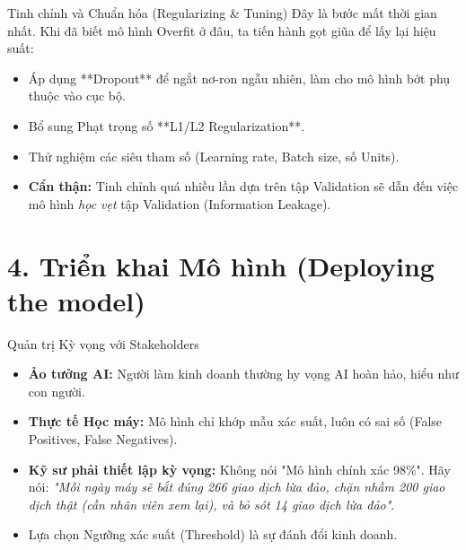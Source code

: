 \documentclass[aspectratio=169]{beamer}
\begin{document}
\begin{frame}{Tinh chỉnh và Chuẩn hóa (Regularizing \& Tuning)}
    Đây là bước mất thời gian nhất. Khi đã biết mô hình Overfit ở đâu, ta tiến hành gọt giũa để lấy lại hiệu suất:
    \begin{itemize}
        \item Áp dụng **Dropout** để ngắt nơ-ron ngẫu nhiên, làm cho mô hình bớt phụ thuộc vào cục bộ.
        \item Bổ sung Phạt trọng số **L1/L2 Regularization**.
        \item Thử nghiệm các siêu tham số (Learning rate, Batch size, số Units).
        \item \textbf{Cẩn thận:} Tinh chỉnh quá nhiều lần dựa trên tập Validation sẽ dẫn đến việc mô hình \textit{học vẹt} tập Validation (Information Leakage).
    \end{itemize}
\end{frame}

\section{4. Triển khai Mô hình (Deploying the model)}

\begin{frame}{Quản trị Kỳ vọng với Stakeholders}
    \begin{itemize}
        \item \textbf{Ảo tưởng AI:} Người làm kinh doanh thường hy vọng AI hoàn hảo, hiểu như con người.
        \item \textbf{Thực tế Học máy:} Mô hình chỉ khớp mẫu xác suất, luôn có sai số (False Positives, False Negatives).
        \item \textbf{Kỹ sư phải thiết lập kỳ vọng:} Không nói "Mô hình chính xác 98\%". Hãy nói: 
        \textit{"Mỗi ngày máy sẽ bắt đúng 266 giao dịch lừa đảo, chặn nhầm 200 giao dịch thật (cần nhân viên xem lại), và bỏ sót 14 giao dịch lừa đảo"}.
        \item Lựa chọn Ngưỡng xác suất (Threshold) là sự đánh đổi kinh doanh.
    \end{itemize}
\end{frame}
\end{document}
